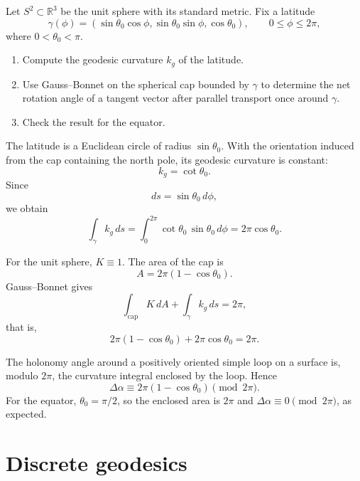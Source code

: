 \begin{problem}
\label{prob:vii-gap-24}
Let \(S^2\subset\mathbb{R}^3\) be the unit sphere with its standard metric.
Fix a latitude
\[
\gamma(\phi)=
(\sin\theta_0\cos\phi,\sin\theta_0\sin\phi,\cos\theta_0),
\qquad 0\le \phi\le 2\pi,
\]
where \(0<\theta_0<\pi\).

\begin{enumerate}
\item Compute the geodesic curvature \(k_g\) of the latitude.
\item Use Gauss--Bonnet on the spherical cap bounded by \(\gamma\) to determine
the net rotation angle of a tangent vector after parallel transport once
around \(\gamma\).
\item Check the result for the equator.
\end{enumerate}
\end{problem}

\begin{solution}
The latitude is a Euclidean circle of radius \(\sin\theta_0\).
With the orientation induced from the cap containing the north pole,
its geodesic curvature is constant:
\[
k_g=\cot\theta_0.
\]
Since
\[
ds=\sin\theta_0\,d\phi,
\]
we obtain
\[
\int_\gamma k_g\,ds
=
\int_0^{2\pi}
\cot\theta_0\,\sin\theta_0\,d\phi
=
2\pi\cos\theta_0.
\]

For the unit sphere, \(K\equiv1\). The area of the cap is
\[
A=2\pi(1-\cos\theta_0).
\]
Gauss--Bonnet gives
\[
\int_{\text{cap}}K\,dA+\int_\gamma k_g\,ds=2\pi,
\]
that is,
\[
2\pi(1-\cos\theta_0)+2\pi\cos\theta_0=2\pi.
\]

The holonomy angle around a positively oriented simple loop on a surface is,
modulo \(2\pi\), the curvature integral enclosed by the loop. Hence
\[
\boxed{\Delta\alpha
\equiv
2\pi(1-\cos\theta_0)\pmod{2\pi}}.
\]
For the equator, \(\theta_0=\pi/2\), so the enclosed area is \(2\pi\) and
\(\Delta\alpha\equiv0\pmod{2\pi}\), as expected.
\end{solution}


\section{Discrete geodesics}

